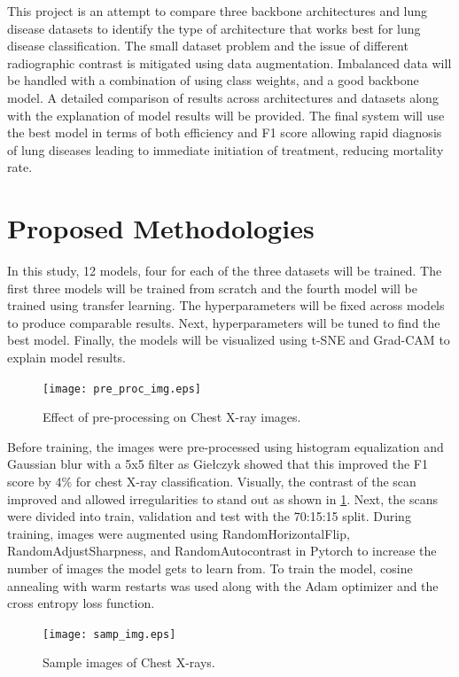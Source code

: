 \documentclass[10pt,twocolumn,letterpaper]{article}
\begin{document}
This project is an attempt to compare three backbone architectures and lung disease datasets to identify the type of architecture that works best for lung disease classification. The small dataset problem and the issue of different radiographic contrast \cite{andrew2022rad} is mitigated using data augmentation. Imbalanced data will be handled with a combination of using class weights, and a good backbone model. A detailed comparison of results across architectures and datasets along with the explanation of model results will be provided. The final system will use the best model in terms of both efficiency and F1 score allowing rapid diagnosis of lung diseases leading to immediate initiation of treatment, reducing mortality rate.
\section{Proposed Methodologies}
\label{sec:prop_method}
In this study, 12 models, four for each of the three datasets will be trained. The first three models will be trained from scratch and the fourth model will be trained using transfer learning. The hyperparameters will be fixed across models to produce comparable results. Next, hyperparameters will be tuned to find the best model. Finally, the models will be visualized using t-SNE and Grad-CAM \cite{jacobgilpytorchcam} to explain model results. 
\begin{figure}[t]
  \centering
  \texttt{[image: pre\_proc\_img.eps]}  
   \caption{Effect of pre-processing on Chest X-ray images.}
   \vspace{-1.5em}
   \label{fig:pre_proc_img}
\end{figure}
Before training, the images were pre-processed using histogram equalization and Gaussian blur with a 5x5 filter as Giełczyk \etal \cite{gielczyk2022pre} showed that this improved the F1 score by 4\% for chest X-ray classification. Visually, the contrast of the scan improved and allowed irregularities to stand out as shown in \cref*{fig:pre_proc_img}. Next, the scans were divided into train, validation and test with the 70:15:15 split. During training, images were augmented using RandomHorizontalFlip, RandomAdjustSharpness, and RandomAutocontrast in Pytorch \cite{transforms} to increase the number of images the model gets to learn from. To train the model, cosine annealing with warm restarts \cite{loshchilov2016sgdr} was used along with the Adam optimizer \cite{kingma2014adam} and the cross entropy loss function. 
\begin{figure}[t]
  \centering
  \texttt{[image: samp\_img.eps]}  
   \caption{Sample images of Chest X-rays.}
   \vspace{-1em}
   \label{fig:sample_img}
\end{figure}
\end{document}
